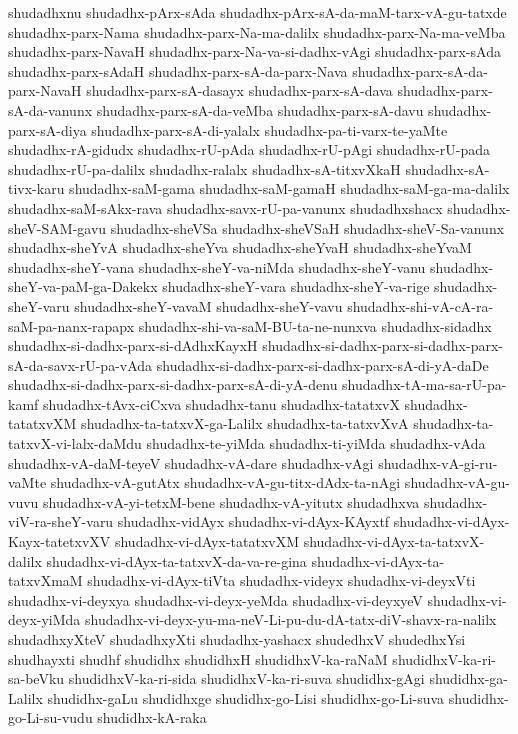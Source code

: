 {shudadhxnu
shudadhx-pArx-sAda
shudadhx-pArx-sA-da-maM-tarx-vA-gu-tatxde
shudadhx-parx-Nama
shudadhx-parx-Na-ma-dalilx
shudadhx-parx-Na-ma-veMba
shudadhx-parx-NavaH
shudadhx-parx-Na-va-si-dadhx-vAgi
shudadhx-parx-sAda
shudadhx-parx-sAdaH
shudadhx-parx-sA-da-parx-Nava
shudadhx-parx-sA-da-parx-NavaH
shudadhx-parx-sA-dasayx
shudadhx-parx-sA-dava
shudadhx-parx-sA-da-vanunx
shudadhx-parx-sA-da-veMba
shudadhx-parx-sA-davu
shudadhx-parx-sA-diya
shudadhx-parx-sA-di-yalalx
shudadhx-pa-ti-varx-te-yaMte
shudadhx-rA-gidudx
shudadhx-rU-pAda
shudadhx-rU-pAgi
shudadhx-rU-pada
shudadhx-rU-pa-dalilx
shudadhx-ralalx
shudadhx-sA-titxvXkaH
shudadhx-sA-tivx-karu
shudadhx-saM-gama
shudadhx-saM-gamaH
shudadhx-saM-ga-ma-dalilx
shudadhx-saM-sAkx-rava
shudadhx-savx-rU-pa-vanunx
shudadhxshacx
shudadhx-sheV-SAM-gavu
shudadhx-sheVSa
shudadhx-sheVSaH
shudadhx-sheV-Sa-vanunx
shudadhx-sheYvA
shudadhx-sheYva
shudadhx-sheYvaH
shudadhx-sheYvaM
shudadhx-sheY-vana
shudadhx-sheY-va-niMda
shudadhx-sheY-vanu
shudadhx-sheY-va-paM-ga-Dakekx
shudadhx-sheY-vara
shudadhx-sheY-va-rige
shudadhx-sheY-varu
shudadhx-sheY-vavaM
shudadhx-sheY-vavu
shudadhx-shi-vA-cA-ra-saM-pa-nanx-rapapx
shudadhx-shi-va-saM-BU-ta-ne-nunxva
shudadhx-sidadhx
shudadhx-si-dadhx-parx-si-dAdhxKayxH
shudadhx-si-dadhx-parx-si-dadhx-parx-sA-da-savx-rU-pa-vAda
shudadhx-si-dadhx-parx-si-dadhx-parx-sA-di-yA-daDe
shudadhx-si-dadhx-parx-si-dadhx-parx-sA-di-yA-denu
shudadhx-tA-ma-sa-rU-pa-kamf
shudadhx-tAvx-ciCxva
shudadhx-tanu
shudadhx-tatatxvX
shudadhx-tatatxvXM
shudadhx-ta-tatxvX-ga-Lalilx
shudadhx-ta-tatxvXvA
shudadhx-ta-tatxvX-vi-lalx-daMdu
shudadhx-te-yiMda
shudadhx-ti-yiMda
shudadhx-vAda
shudadhx-vA-daM-teyeV
shudadhx-vA-dare
shudadhx-vAgi
shudadhx-vA-gi-ru-vaMte
shudadhx-vA-gutAtx
shudadhx-vA-gu-titx-dAdx-ta-nAgi
shudadhx-vA-gu-vuvu
shudadhx-vA-yi-tetxM-bene
shudadhx-vA-yitutx
shudadhxva
shudadhx-viV-ra-sheY-varu
shudadhx-vidAyx
shudadhx-vi-dAyx-KAyxtf
shudadhx-vi-dAyx-Kayx-tatetxvXV
shudadhx-vi-dAyx-tatatxvXM
shudadhx-vi-dAyx-ta-tatxvX-dalilx
shudadhx-vi-dAyx-ta-tatxvX-da-va-re-gina
shudadhx-vi-dAyx-ta-tatxvXmaM
shudadhx-vi-dAyx-tiVta
shudadhx-videyx
shudadhx-vi-deyxVti
shudadhx-vi-deyxya
shudadhx-vi-deyx-yeMda
shudadhx-vi-deyxyeV
shudadhx-vi-deyx-yiMda
shudadhx-vi-deyx-yu-ma-neV-Li-pu-du-dA-tatx-diV-shavx-ra-nalilx
shudadhxyXteV
shudadhxyXti
shudadhx-yashacx
shudedhxV
shudedhxYsi
shudhayxti
shudhf
shudidhx
shudidhxH
shudidhxV-ka-raNaM
shudidhxV-ka-ri-sa-beVku
shudidhxV-ka-ri-sida
shudidhxV-ka-ri-suva
shudidhx-gAgi
shudidhx-ga-Lalilx
shudidhx-gaLu
shudidhxge
shudidhx-go-Lisi
shudidhx-go-Li-suva
shudidhx-go-Li-su-vudu
shudidhx-kA-raka
}
